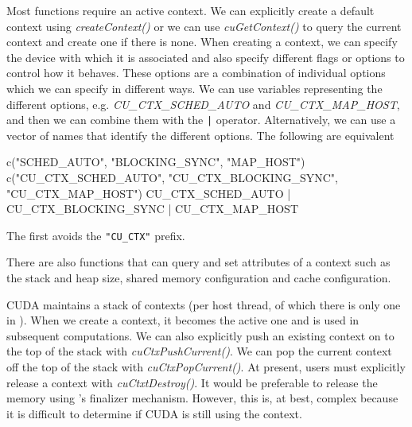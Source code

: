 \documentclass[article]{jss}
\def\R{\proglang{R}}
\def\Rpkg#1{\pkg{#1}}
\def\Rfunc#1{\textsl{#1()}}
\def\Rop#1{\texttt{#1}}
\def\Rvar#1{\textsl{#1}}
\begin{document}
Most \Rpkg{RCUDA} functions require an active context.  We can
explicitly create a default context using \Rfunc{createContext} or we
can use \Rfunc{cuGetContext} to query the current context and create
one if there is none.  When creating a context, we can specify the
device with which it is associated and also specify different flags or
options to control how it behaves.  These options are a combination of
individual options which we can specify in different ways. 
We can use \R{} variables representing the different options, e.g.
\Rvar{CU_CTX_SCHED_AUTO} and \Rvar{CU_CTX_MAP_HOST},
and then we can combine them with the \Rop{|} operator. 
Alternatively, we can use a vector of names that identify the
different options. 
The following are equivalent
\begin{RCode}
c("SCHED_AUTO", "BLOCKING_SYNC", "MAP_HOST")
c("CU_CTX_SCHED_AUTO", "CU_CTX_BLOCKING_SYNC", "CU_CTX_MAP_HOST")
CU_CTX_SCHED_AUTO | CU_CTX_BLOCKING_SYNC | CU_CTX_MAP_HOST
\end{RCode}
The first avoids the \texttt{"CU_CTX"} prefix.

There are also functions that can query and set attributes of a
context such as the stack and heap size, shared memory configuration
and cache configuration.

 CUDA maintains a stack of contexts (per host thread, of which there
 is only one in \R).  When we create a context, it becomes the active
 one and is used in subsequent computations.  We can also explicitly
 push an existing context on to the top of the stack with
 \Rfunc{cuCtxPushCurrent}.  We can pop the current context off the top
 of the stack with \Rfunc{cuCtxPopCurrent}.  At present, \R{} users
 must explicitly release a context with \Rfunc{cuCtxtDestroy}.  It
 would be preferable to release the memory using \R's finalizer
 mechanism. However, this is, at best, complex because it is difficult
 to determine if CUDA is still using the context.
\end{document}
